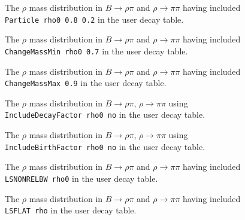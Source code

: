 \begin{figure}
\caption{The $\rho$ mass distribution in 
$B \to \rho \pi$ and $\rho \to \pi \pi$ having included {\tt Particle rho0 0.8 0.2} 
in the user decay table.}
\label{fig:masswid}
\end{figure}

\begin{figure}
\caption{The $\rho$ mass distribution in 
$B \to \rho \pi$ and $\rho \to \pi \pi$ having included {\tt ChangeMassMin rho0 0.7} 
in the user decay table.}
\label{fig:min}
\end{figure}

\begin{figure}
\caption{The $\rho$ mass distribution in 
$B \to \rho \pi$ and $\rho \to \pi \pi$ having included {\tt ChangeMassMax 0.9} 
in the user decay table.}
\label{fig:max}
\end{figure}

\begin{figure}
\caption{The $\rho$ mass distribution in 
$B \to \rho \pi$, $\rho \to \pi \pi$ using {\tt IncludeDecayFactor rho0 no} 
in the user decay table.}
\label{fig:decayfactor}
\end{figure}

\begin{figure}
\caption{The $\rho$ mass distribution in 
$B \to \rho \pi$, $\rho \to \pi \pi$ using {\tt IncludeBirthFactor rho0 no} 
in the user decay table.}
\label{fig:birthfactor}
\end{figure}

\begin{figure}
\caption{The $\rho$ mass distribution in 
$B \to \rho \pi$ and $\rho \to \pi \pi$ having included {\tt LSNONRELBW rho0} 
in the user decay table.}
\label{fig:massnonrel}
\end{figure}

\begin{figure}
\caption{The $\rho$ mass distribution in 
$B \to \rho \pi$ and $\rho \to \pi \pi$ having included {\tt LSFLAT rho} 
in the user decay table.}
\label{fig:flat}
\end{figure}









